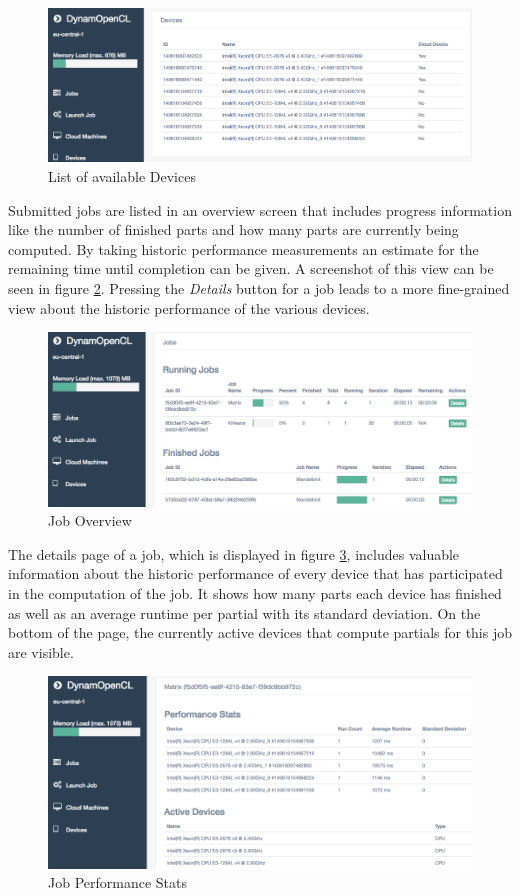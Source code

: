 \begin{figure}[!htb]
	\includegraphics[width=1\textwidth]{screenshots/available_devices.png}
	\centering
	\caption{List of available Devices}
	\label{img:available_devices}
\end{figure}

Submitted jobs are listed in an overview screen that includes progress information like the number of finished parts and how many parts are currently being computed. By taking historic performance measurements an estimate for the remaining time until completion can be given. A screenshot of this view can be seen in figure \ref{img:job_overview}. Pressing the \textit{Details} button for a job leads to a more fine-grained view about the historic performance of the various devices.

\begin{figure}[!htb]
	\includegraphics[width=1\textwidth]{screenshots/job_overview.png}
	\centering
	\caption{Job Overview}
	\label{img:job_overview}
\end{figure}

The details page of a job, which is displayed in figure \ref{img:job_details}, includes valuable information about the historic performance of every device that has participated in the computation of the job. It shows how many parts each device has finished as well as an average runtime per partial with its standard deviation. On the bottom of the page, the currently active devices that compute partials for this job are visible.

\begin{figure}[!htb]
	\includegraphics[width=1\textwidth]{screenshots/job_details.png}
	\centering
	\caption{Job Performance Stats}
	\label{img:job_details}
\end{figure}
